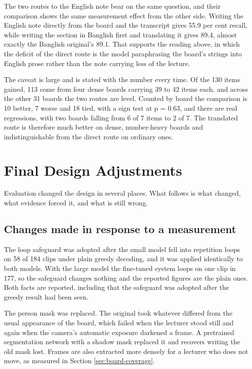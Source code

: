 The two routes to the English note bear on the same question, and their comparison shows
the same measurement effect from the other side. Writing the English note directly from
the board and the transcript gives 55.9 per cent
recall, while writing the section in Banglish first and translating it gives 89.4, almost
exactly the Banglish original's 89.1. That supports the reading above, in which the
deficit of the direct route is the model paraphrasing the board's strings into English
prose rather than the note carrying less of the lecture.

The caveat is large and is stated with the number every time. Of the 130 items gained, 113
come from four dense boards carrying 39 to 42 items each, and across the other 31 boards
the two routes are level. Counted by board the comparison is 10 better, 7 worse and 18
tied, with a sign test at p = 0.63, and there are real regressions, with two boards falling
from 6 of 7 items to 2 of 7. The translated route is therefore much better on dense,
number-heavy boards and indistinguishable from the direct route on ordinary ones.

\section{Final Design Adjustments}
\label{sec:adjustments}

Evaluation changed the design in several places. What follows is what changed, what
evidence forced it, and what is still wrong.

\subsection{Changes made in response to a measurement}

The loop safeguard was adopted after the small model fell into repetition loops on 58 of
184 clips under plain greedy decoding, and it was applied identically to both models. With
the large model the fine-tuned system loops on one clip in 177, so the safeguard changes
nothing and the reported figures are the plain ones. Both facts are reported, including
that the safeguard was adopted after the greedy result had been seen.

The person mask was replaced. The original took whatever differed from the usual
appearance of the board, which failed when the lecturer stood still and again when the
camera's automatic exposure darkened a frame. A pretrained segmentation network with a
shadow mask replaced it and recovers writing the old mask lost. Frames are also extracted
more densely for a lecturer who does not move, as measured in Section
\ref{sec:board-coverage}.

